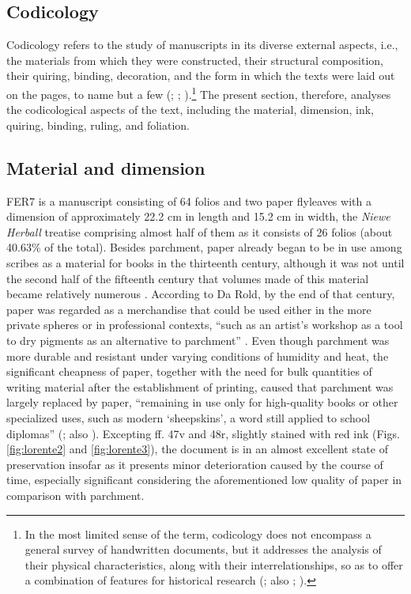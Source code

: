 \begin{paper}
\section{Codicology}

Codicology refers to the study of manuscripts in its diverse external
aspects, i.e., the materials from which they were constructed, their
structural composition, their quiring, binding, decoration, and the form
in which the texts were laid out on the pages, to name but a few (\cite[78--79]{beal_dictionary_2008}; \cite[141]{mathisen_palaeography_2008}; \cite[112]{nystrom_codicological_2014}).\footnote{In the
  most limited sense of the term, codicology does not encompass a
  general survey of handwritten documents, but it addresses the analysis
  of their physical characteristics, along with their
  interrelationships, so as to offer a combination of features for
  historical research (\cite[102]{gruijs_codicology_1972}; also \cite[34]{beal_dictionary_2008}; \cite[112]{nystrom_codicological_2014}).} The present section, therefore, analyses the
codicological aspects of the text, including the
material, dimension, ink, quiring, binding, ruling, and foliation.

\subsection{Material and dimension}

FER7 is a manuscript consisting of 64 folios and two paper flyleaves with a
dimension of approximately 22.2 cm in length and 15.2 cm in width, the
\emph{Niewe Herball} treatise comprising almost half of them as it
consists of 26 folios (about 40.63\% of the total). Besides parchment, paper already began to be in
use among scribes as a material for books in
the thirteenth century, although it was not until the second half of the
fifteenth century that volumes made of this material became relatively
numerous \citep[31]{derolez_palaeography_2003}. According to Da Rold, by the end of that
century, paper was regarded as a merchandise that could be used either
in the more private spheres or in professional contexts, ``such as an
artist's workshop as a tool to dry pigments as an alternative to
parchment'' \citep[56]{da_rold_paper_2020}.
Even though parchment was more durable and resistant under varying
conditions of humidity and heat, the significant cheapness of paper,
together with the need for bulk quantities of writing material after the
establishment of printing, caused that parchment was largely replaced by
paper, ``remaining in use only for high-quality books or other
specialized uses, such as modern `sheepskins', a word still applied to
school diplomas'' (\cite[144]{mathisen_palaeography_2008}; also \cite[5]{petti_english_1977}). Excepting
ff. 47v and 48r, slightly stained with red ink (Figs. \ref{fig:lorente2} and \ref{fig:lorente3}), the
document is in an almost excellent state of preservation
insofar as it presents minor deterioration caused by the course of time,
especially significant considering the aforementioned low quality of paper in comparison with parchment.


\end{paper}
